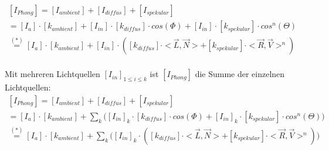 \documentclass[a4paper]{scrartcl}%
\begin{document}
        \begin{equation}
            \label{eq:phong}
            \begin{multlined}
                [I_{Phong}] = [I_{ambient}] + [I_{diffus}] + [I_{spekular}]\\
                = [I_a] \cdot [k_{ambient}] + [I_{in}] \cdot [k_{diffus}] \cdot cos(\Phi) + [I_{in}] \cdot [k_{spekular}] \cdot cos^n(\Theta)\\
                \overset{(*)}{=} [I_a] \cdot [k_{ambient}] + [I_{in}] \cdot ([k_{diffus}] \cdot <\vec{L}, \vec{N}> + [k_{spekular}] \cdot <\vec{R}, \vec{V}>^n)\\
            \end{multlined}
        \end{equation}

        Mit mehreren Lichtquellen $[I_{in}]_{1\leq i \leq k}$ ist $[I_{Phong}]$ die Summe der einzelnen Lichtquellen:\\
    
        \begin{equation}
            \label{eq:phong-multi}
            \begin{multlined}
                [I_{Phong}] = [I_{ambient}] + [I_{diffus}] + [I_{spekular}]\\
                = [I_a] \cdot [k_{ambient}] + \sum_k \Big([I_{in}]_k \cdot [k_{diffus}] \cdot cos(\Phi) + [I_{in}]_k \cdot [k_{spekular}] \cdot cos^n(\Theta)\Big)\\
                \overset{(*)}{=} [I_a] \cdot [k_{ambient}] + \sum_k \Big([I_{in}]_k \cdot ([k_{diffus}] \cdot <\vec{L}, \vec{N}> + [k_{spekular}] \cdot <\vec{R}, \vec{V}>^n)\Big)\\
            \end{multlined}
        \end{equation}
        
\end{document}
